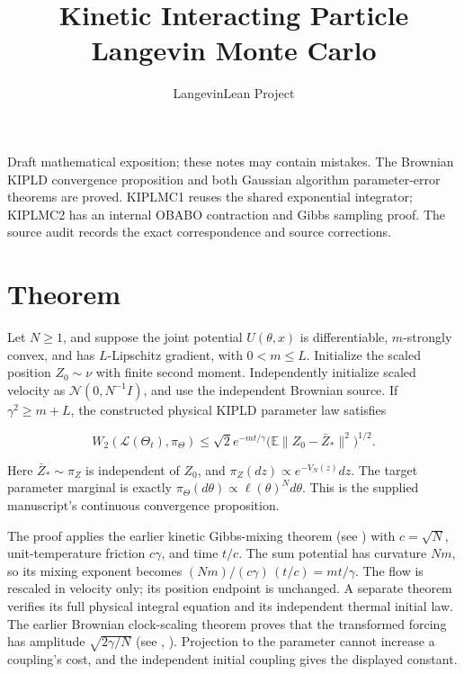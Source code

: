 \documentclass[11pt,a4paper]{article}
\title{\texorpdfstring{Kinetic Interacting Particle Langevin Monte Carlo}{Kinetic Interacting Particle Langevin Monte Carlo}}
\author{LangevinLean Project}
\date{}
\begin{document}
\maketitle
Draft mathematical exposition; these notes may contain mistakes.
The Brownian KIPLD convergence proposition and both Gaussian algorithm parameter-error theorems are proved. KIPLMC1 reuses the shared exponential integrator; KIPLMC2 has an internal OBABO contraction and Gibbs sampling proof. The source audit records the exact correspondence and source corrections.
\section{\texorpdfstring{Theorem}{Theorem}}


Let \(N\ge1\), and suppose the joint potential \(U(\theta,x)\) is differentiable, \(m\)-strongly convex, and has \(L\)-Lipschitz gradient, with \(0<m\le L\). Initialize the scaled position \(Z_0\sim\nu\) with finite second moment. Independently initialize scaled velocity as \(\mathcal N(0,N^{-1}I)\), and use the independent Brownian source. If \(\gamma^2\ge m+L\), the constructed physical KIPLD parameter law satisfies


\[\boxed{W_2(\mathcal L(\Theta_t),\pi_\Theta)\le\sqrt2e^{-mt/\gamma}\bigl(\mathbb E\|Z_0-\bar Z_*\|^2\bigr)^{1/2}.}\]


Here \(\bar Z_*\sim\pi_Z\) is independent of \(Z_0\), and \(\pi_Z(dz)\propto e^{-V_N(z)}dz\). The target parameter marginal is exactly \(\pi_\Theta(d\theta)\propto\ell(\theta)^N d\theta\). This is the supplied manuscript’s continuous convergence proposition.




The proof applies the earlier kinetic Gibbs-mixing theorem (see \cite[Section~3.58.4]{LangevinLean2026Kinetic}) with \(c=\sqrt N\), unit-temperature friction \(c\gamma\), and time \(t/c\). The sum potential has curvature \(Nm\), so its mixing exponent becomes \((Nm)/(c\gamma)\,(t/c)=mt/\gamma\). The flow is rescaled in velocity only; its position endpoint is unchanged. A separate theorem verifies its full physical integral equation and its independent thermal initial law. The earlier Brownian clock-scaling theorem proves that the transformed forcing has amplitude \(\sqrt{2\gamma/N}\) (see \cite[Section~3.105.1]{LangevinLean2026Kinetic}, \cite[Section~3.105.2]{LangevinLean2026Kinetic}). Projection to the parameter cannot increase a coupling’s cost, and the independent initial coupling gives the displayed constant.
\end{document}
